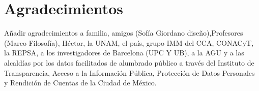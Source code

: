\chapter{Agradecimientos}


Añadir agradecimientos a familia, amigos (Sofía Giordano diseño),Profesores (Marco Filosofía), Héctor, la UNAM, el país, grupo IMM del CCA, CONACyT, la REPSA, a los investigadores de Barcelona (UPC Y UB), a la AGU y a las alcaldías por los datos facilitados de alumbrado público a través del Instituto de Transparencia, Acceso a la Información Pública, Protección de Datos Personales y Rendición de Cuentas de la Ciudad de México.







